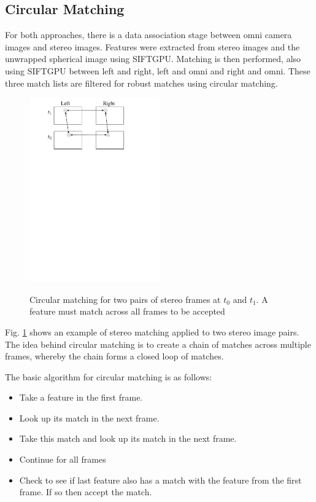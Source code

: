 \subsection{Circular Matching}


For both approaches, there is a data association stage between omni camera images and stereo images.  Features were extracted from stereo images and the unwrapped spherical image using SIFTGPU.  Matching is then performed, also using SIFTGPU between left and right, left and omni and right and omni.  These three match lists are filtered for robust matches using circular matching. 

\begin{figure}[h]
  \centering
    \includegraphics[width=0.5\textwidth]{chapters/images/stereo_circular_matching}\\
  \caption{Circular matching for two pairs of stereo frames at $t_0$ and $t_1$. A feature must match across all frames to be accepted}
  \label{fig:stereo_circular_matching}
\end{figure}

Fig. \ref{fig:stereo_circular_matching} shows an example of stereo matching applied to two stereo image pairs.  The idea behind circular matching is to create a chain of matches across multiple frames, whereby the chain forms a closed loop of matches. 

The basic algorithm for circular matching is as follows:  
\begin{itemize} \itemsep1pt  \parskip0pt 
 \item Take a feature in the first frame.  
 \item Look up its match in the next frame.  
 \item Take this match and look up its match in the next frame.  
 \item Continue for all frames
 \item Check to see if last feature also has a match with the feature from the first frame.  
 \subitem If so then accept the match.
\end{itemize}


